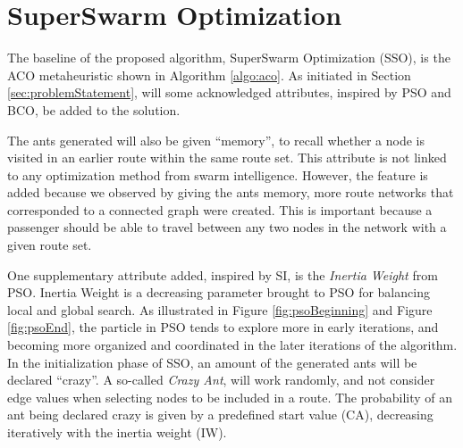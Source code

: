 \section{SuperSwarm Optimization}
\label{section:methodDescription}

The baseline of the proposed algorithm, SuperSwarm Optimization (SSO), is the ACO metaheuristic shown in Algorithm \vref{algo:aco}. As initiated in Section \vref{sec:problemStatement}, will some acknowledged attributes, inspired by PSO and BCO, be added to the solution.

The ants generated will also be given ``memory'', to recall whether a node is visited in an earlier route within the same route set. This attribute is not linked to any optimization method from swarm intelligence. However, the feature is added because we observed by giving the ants memory, more route networks that corresponded to a connected graph were created. This is important because a passenger should be able to travel between any two nodes in the network with a given route set. 

One supplementary attribute added, inspired by SI, is the \textit{Inertia Weight} from PSO. Inertia Weight is a decreasing parameter brought to PSO for balancing local and global search. As illustrated in Figure \vref{fig:psoBeginning} and Figure \vref{fig:psoEnd}, the particle in PSO tends to explore more in early iterations, and becoming more organized and coordinated in the later iterations of the algorithm. In the initialization phase of SSO, an amount of the generated ants will be declared ``crazy''. A so-called \textit{Crazy Ant}, will work randomly, and not consider edge values when selecting nodes to be included in a route. The probability of an ant being declared crazy is given by a predefined start value (CA), decreasing iteratively with the inertia weight (IW). %

